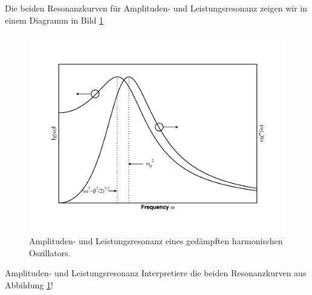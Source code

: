 Die beiden Resonanzkurven für Amplituden- und Leistungsresonanz zeigen wir in
einem Diagramm in Bild \ref{fig:resonances}
\begin{figure}[!h]
\begin{center}
\includegraphics[height=0.6\textwidth]{fig/resonanz.pdf}
\caption{Amplituden- und Leistungsresonanz eines gedämpften harmonischen Oszillators.\label{fig:resonances}}
\end{center}
\end{figure}\newpage
\begin{exercise}{Amplituden- und Leistungsresonanz}
Interpretiere die beiden Resonanzkurven aus Abbildung \ref{fig:resonances}!
\end{exercise}
%
